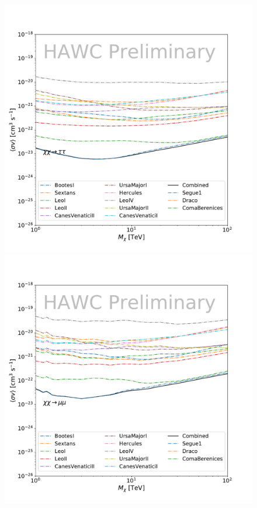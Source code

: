 \begin{figure}[ht]
{    \includegraphics[scale=0.21]{figures/glory_duck/hawc/Combined95_GD_tautau.pdf}
    \includegraphics[scale=0.21]{figures/glory_duck/hawc/Combined95_GD_mumu.pdf}
}
\end{figure}
